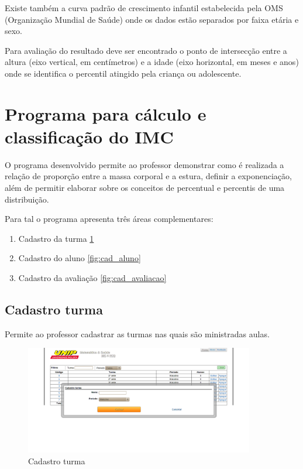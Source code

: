     Existe também a curva padrão de crescimento infantil estabelecida pela OMS
    (Organização Mundial de Saúde) onde os dados estão separados por faixa
    etária e sexo.

    Para avaliação do resultado deve ser encontrado o ponto de intersecção entre
    a altura (eixo vertical, em centímetros) e a idade (eixo horizontal, em
    meses e anos) onde se identifica o percentil atingido pela criança ou
    adolescente.

    \section{Programa para cálculo e classificação do IMC}
    O programa desenvolvido permite ao professor demonstrar como é realizada a
    relação de proporção entre a massa corporal e a estura, definir a
    exponenciação, além de permitir elaborar sobre os conceitos de percentual
    e percentis de uma distribuição.

    Para tal o programa apresenta três áreas complementares:

    \begin{enumerate}

        \item Cadastro da turma \ref{fig:cad_turma}

        \item Cadastro do aluno \ref{fig:cad_aluno}

        \item Cadastro da avaliação \ref{fig:cad_avaliacao}

    \end{enumerate}

        \subsection{Cadastro turma}

        Permite ao professor cadastrar as turmas nas quais são ministradas aulas.

        \begin{figure}[htb]
            \centering
            \includegraphics[width=10cm]{programa/media/image/cadastro_turma.png}
            \caption{Cadastro turma}
            \label{fig:cad_turma}
        \end{figure}

